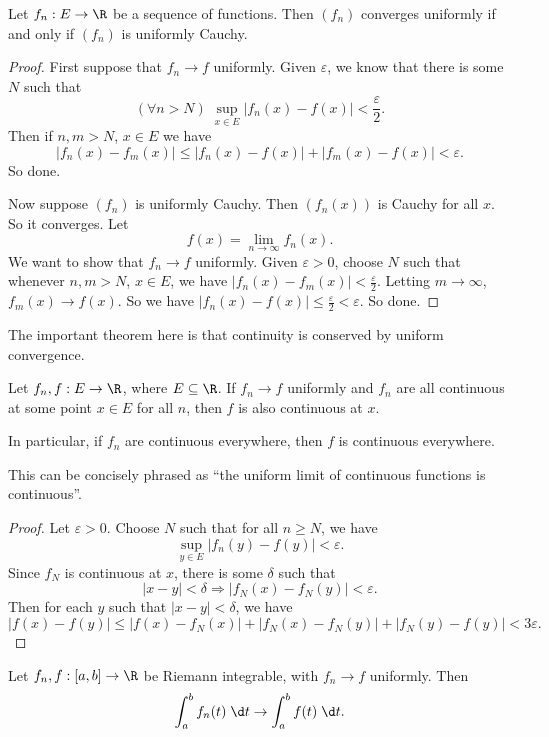 \documentclass[a4paper]{article}
\begin{document}
\begin{thm}[]
  Let $f_n: E\to \R$ be a sequence of functions. Then $(f_n)$ converges uniformly if and only if $(f_n)$ is uniformly Cauchy.
\end{thm}

\begin{proof}
  First suppose that $f_n \to f$ uniformly. Given $\varepsilon$, we know that there is some $N$ such that
  \[
    (\forall n > N)\; \sup_{x\in E} |f_n(x) - f(x)| < \frac{\varepsilon}{2}.
  \]
  Then if $n, m > N$, $x\in E$ we have
  \[
    |f_n(x) - f_m(x)| \leq |f_n(x) - f(x)| + |f_m(x) - f(x)| < \varepsilon.
  \]
  So done.

  Now suppose $(f_n)$ is uniformly Cauchy. Then $(f_n(x))$ is Cauchy for all $x$. So it converges. Let
  \[
    f(x) = \lim_{n\to \infty}f_n(x).
  \]
  We want to show that $f_n \to f$ uniformly. Given $\varepsilon > 0$, choose $N$ such that whenever $n, m > N$, $x\in E$, we have $|f_n(x) - f_m(x)| < \frac{\varepsilon}{2}$. Letting $m\to \infty$, $f_m(x) \to f(x)$. So we have $|f_n(x) - f(x)| \leq \frac{\varepsilon}{2} < \varepsilon$. So done.
\end{proof}

The important theorem here is that continuity is conserved by uniform convergence.
\begin{thm}
  Let $f_n, f: E\to \R$, where $E\subseteq \R$. If $f_n \to f$ uniformly and $f_n$ are all continuous at some point $x\in E$ for all $n$, then $f$ is also continuous at $x$.

  In particular, if $f_n$ are continuous everywhere, then $f$ is continuous everywhere.
\end{thm}
This can be concisely phrased as ``the uniform limit of continuous functions is continuous''.

\begin{proof}
  Let $\varepsilon > 0$. Choose $N$ such that for all $n \geq N$, we have
  \[
    \sup_{y\in E}|f_n(y) - f(y)| < \varepsilon.
  \]
  Since $f_N$ is continuous at $x$, there is some $\delta$ such that
  \[
    |x - y| < \delta \Rightarrow |f_N(x) - f_N(y)| < \varepsilon.
  \]
  Then for each $y$ such that $|x - y| < \delta$, we have
  \[
    |f(x) - f(y)| \leq |f(x) - f_N(x)| + |f_N(x) - f_N(y)| + |f_N(y) - f(y)| < 3\varepsilon.
  \]
\end{proof}

\begin{thm}
  Let $f_n, f: [a, b]\to \R$ be Riemann integrable, with $f_n \to f$ uniformly. Then
  \[
    \int_a^b f_n(t)\;\d t \to \int_a^b f(t)\;\d t.
  \]
\end{thm}
\end{document}
